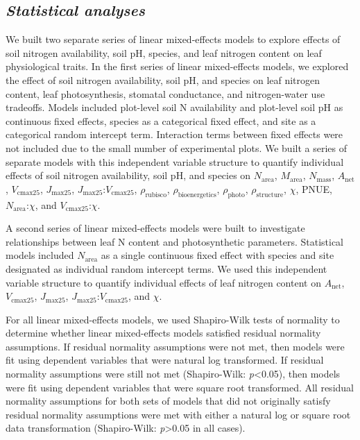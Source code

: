 \subsection{\textit{Statistical analyses}}
We built two separate series of linear mixed-effects models to explore effects of soil nitrogen availability, soil pH, species, and leaf nitrogen content on leaf physiological traits. In the first series of linear mixed-effects models, we explored the effect of soil nitrogen availability, soil pH, and species on leaf nitrogen content, leaf photosynthesis, stomatal conductance, and nitrogen-water use tradeoffs. Models included plot-level soil N availability and plot-level soil pH as continuous fixed effects, species as a categorical fixed effect, and site as a categorical random intercept term. Interaction terms between fixed effects were not included due to the small number of experimental plots. We built a series of separate models with this independent variable structure to quantify individual effects of soil nitrogen availability, soil pH, and species on $N_\mathrm{area}$, $M_\mathrm{area}$, $N_\mathrm{mass}$, $A_\mathrm{net}$, $V_\mathrm{cmax25}$, $J_\mathrm{max25}$, $J_\mathrm{max25}$:$V_\mathrm{cmax25}$, $\rho_\mathrm{rubisco}$, $\rho_\mathrm{bioenergetics}$, $\rho_\mathrm{photo}$, $\rho_\mathrm{structure}$, $\chi$, PNUE, $N_\mathrm{area}$:$\chi$, and $V_\mathrm{cmax25}$:$\chi$.

A second series of linear mixed-effects models were built to investigate relationships between leaf N content and photosynthetic parameters. Statistical models included $N_\mathrm{area}$ as a single continuous fixed effect with species and site designated as individual random intercept terms. We used this independent variable structure to quantify individual effects of leaf nitrogen content on $A_\mathrm{net}$, $V_\mathrm{cmax25}$, $J_\mathrm{max25}$, $J_\mathrm{max25}$:$V_\mathrm{cmax25}$, and $\chi$.

For all linear mixed-effects models, we used Shapiro-Wilk tests of normality to determine whether linear mixed-effects models satisfied residual normality assumptions. If residual normality assumptions were not met, then models were fit using dependent variables that were natural log transformed. If residual normality assumptions were still not met (Shapiro-Wilk: \textit{p}<0.05), then models were fit using dependent variables that were square root transformed. All residual normality assumptions for both sets of models that did not originally satisfy residual normality assumptions were met with either a natural log or square root data transformation (Shapiro-Wilk: \textit{p}>0.05 in all cases).

